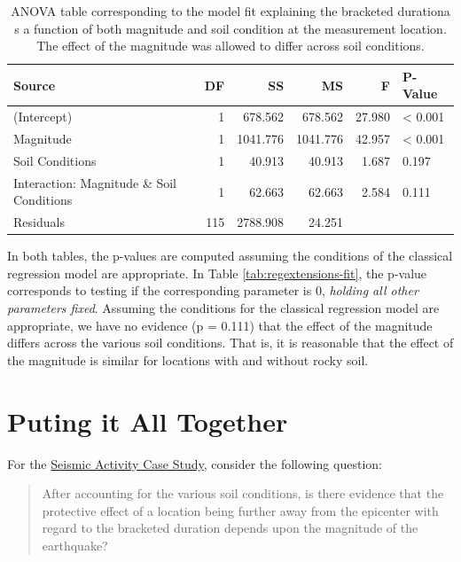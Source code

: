 \documentclass[]{book}
\theoremstyle{plain}
\theoremstyle{mydefn}
\theoremstyle{myexmpl}
\theoremstyle{remark}
\begin{document}
\begin{table}

\caption{\label{tab:regextensions-anova}ANOVA table corresponding to the model fit explaining the bracketed durationa s a function of both magnitude and soil condition at the measurement location.  The effect of the magnitude was allowed to differ across soil conditions.}
\centering
\begin{tabular}[t]{l|r|r|r|r|l}
\hline
Source & DF & SS & MS & F & P-Value\\
\hline
(Intercept) & 1 & 678.562 & 678.562 & 27.980 & < 0.001\\
\hline
Magnitude & 1 & 1041.776 & 1041.776 & 42.957 & < 0.001\\
\hline
Soil Conditions & 1 & 40.913 & 40.913 & 1.687 & 0.197\\
\hline
Interaction: Magnitude \& Soil Conditions & 1 & 62.663 & 62.663 & 2.584 & 0.111\\
\hline
Residuals & 115 & 2788.908 & 24.251 &  & \\
\hline
\end{tabular}
\end{table}

In both tables, the p-values are computed assuming the conditions of the
classical regression model are appropriate. In Table
\ref{tab:regextensions-fit}, the p-value corresponds to testing if the
corresponding parameter is 0, \emph{holding all other parameters fixed}.
Assuming the conditions for the classical regression model are
appropriate, we have no evidence (p = 0.111) that the effect of the
magnitude differs across the various soil conditions. That is, it is
reasonable that the effect of the magnitude is similar for locations
with and without rocky soil.

\chapter{Puting it All Together}\label{Regrecap}

For the \protect\hyperlink{CaseGreece}{Seismic Activity Case Study},
consider the following question:

\begin{quote}
After accounting for the various soil conditions, is there evidence that
the protective effect of a location being further away from the
epicenter with regard to the bracketed duration depends upon the
magnitude of the earthquake?
\end{quote}
\end{document}

